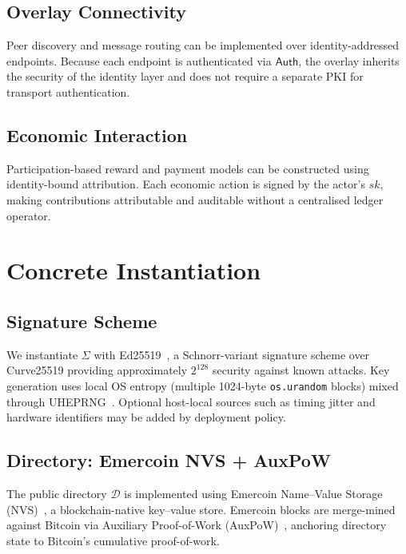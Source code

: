 \documentclass[11pt,a4paper]{article}
\begin{document}
\subsection{Overlay Connectivity}

Peer discovery and message routing can be implemented over identity-addressed
endpoints.  Because each endpoint is authenticated via $\mathsf{Auth}$, the
overlay inherits the security of the identity layer and does not require a
separate PKI for transport authentication.

\subsection{Economic Interaction}

Participation-based reward and payment models can be constructed using
identity-bound attribution.  Each economic action is signed by the actor's
$sk$, making contributions attributable and auditable without a centralised
ledger operator.

\section{Concrete Instantiation}
\label{sec:instantiation}

\subsection{Signature Scheme}

We instantiate $\Sigma$ with Ed25519~\cite{eddsa}, a Schnorr-variant
signature scheme over Curve25519 providing approximately $2^{128}$ security
against known attacks. Key generation uses local OS entropy
(multiple 1024-byte \texttt{os.urandom} blocks) mixed through
UHEPRNG~\cite{uheprng}. Optional host-local sources such as timing jitter
and hardware identifiers may be added by deployment policy.

\subsection{Directory: Emercoin NVS + AuxPoW}

The public directory $\mathcal{D}$ is implemented using Emercoin
Name--Value Storage (NVS)~\cite{emercoin}, a blockchain-native key--value
store.  Emercoin blocks are merge-mined against Bitcoin via Auxiliary
Proof-of-Work (AuxPoW)~\cite{hack51}, anchoring directory state to
Bitcoin's cumulative proof-of-work.
\end{document}
